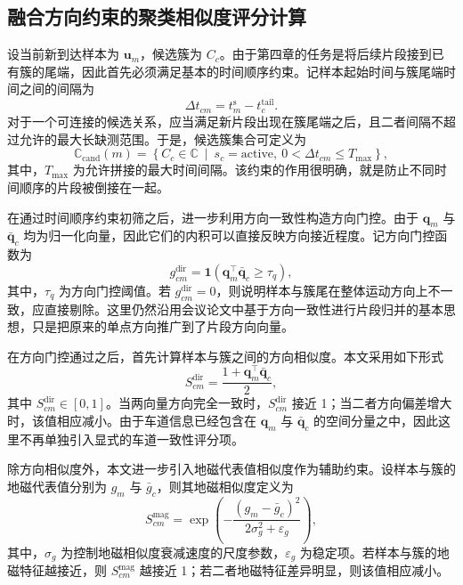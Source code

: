 \documentclass{xdupgthesis}
\begin{document}
\subsection{融合方向约束的聚类相似度评分计算}

设当前新到达样本为 $\mathbf{u}_m$，候选簇为 $C_c$。由于第四章的任务是将后续片段接到已有簇的尾端，因此首先必须满足基本的时间顺序约束。记样本起始时间与簇尾端时间之间的间隔为
\begin{equation}
	\Delta t_{cm}=t_m^{\mathrm{s}}-t_c^{\mathrm{tail}}.
\end{equation}
对于一个可连接的候选关系，应当满足新片段出现在簇尾端之后，且二者间隔不超过允许的最大长缺测范围。于是，候选簇集合可定义为
\begin{equation}
	\mathbb{C}_{\mathrm{cand}}(m)=
	\left\{
	C_c\in\mathbb{C}\ \middle|\ s_c=\mathrm{active},\ 0<\Delta t_{cm}\le T_{\max}
	\right\},
\end{equation}
其中，$T_{\max}$ 为允许拼接的最大时间间隔。该约束的作用很明确，就是防止不同时间顺序的片段被倒接在一起。

在通过时间顺序约束初筛之后，进一步利用方向一致性构造方向门控。由于 $\mathbf{q}_m$ 与 $\bar{\mathbf{q}}_c$ 均为归一化向量，因此它们的内积可以直接反映方向接近程度。记方向门控函数为
\begin{equation}
	g_{cm}^{\mathrm{dir}}=
	\mathbf{1}
	\left(
	\mathbf{q}_m^{\top}\bar{\mathbf{q}}_c\ge \tau_q
	\right),
\end{equation}
其中，$\tau_q$ 为方向门控阈值。若 $g_{cm}^{\mathrm{dir}}=0$，则说明样本与簇尾在整体运动方向上不一致，应直接剔除。这里仍然沿用会议论文中基于方向一致性进行片段归并的基本思想，只是把原来的单点方向推广到了片段方向向量。

在方向门控通过之后，首先计算样本与簇之间的方向相似度。本文采用如下形式
\begin{equation}
	S_{cm}^{\mathrm{dir}}=
	\frac{1+\mathbf{q}_m^{\top}\bar{\mathbf{q}}_c}{2},
\end{equation}
其中 $S_{cm}^{\mathrm{dir}}\in[0,1]$。当两向量方向完全一致时，$S_{cm}^{\mathrm{dir}}$ 接近 1；当二者方向偏差增大时，该值相应减小。由于车道信息已经包含在 $\mathbf{q}_m$ 与 $\bar{\mathbf{q}}_c$ 的空间分量之中，因此这里不再单独引入显式的车道一致性评分项。

除方向相似度外，本文进一步引入地磁代表值相似度作为辅助约束。设样本与簇的地磁代表值分别为 $g_m$ 与 $\bar{g}_c$，则其地磁相似度定义为
\begin{equation}
	S_{cm}^{\mathrm{mag}}=
	\exp
	\left(
	-\frac{(g_m-\bar{g}_c)^2}{2\sigma_g^2+\varepsilon_g}
	\right),
\end{equation}
其中，$\sigma_g$ 为控制地磁相似度衰减速度的尺度参数，$\varepsilon_g$ 为稳定项。若样本与簇的地磁特征越接近，则 $S_{cm}^{\mathrm{mag}}$ 越接近 1；若二者地磁特征差异明显，则该值相应减小。
\end{document}

